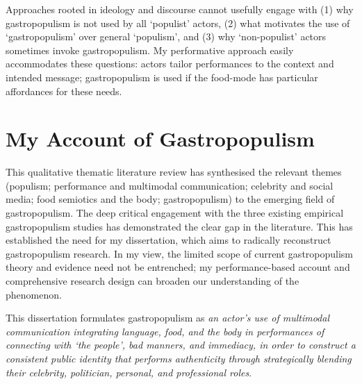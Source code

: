 \documentclass[a4paper, nobind]{templates/ociamthesis}
\begin{document}
Approaches rooted in ideology and discourse cannot usefully engage with (1) why gastropopulism is not used by all `populist' actors, (2) what motivates the use of `gastropopulism' over general `populism', and (3) why `non-populist' actors sometimes invoke gastropopulism. My performative approach easily accommodates these questions: actors tailor performances to the context and intended message; gastropopulism is used if the food-mode has particular affordances for these needs.

\hypertarget{my-account-of-gastropopulism}{%
\section{My Account of Gastropopulism}\label{my-account-of-gastropopulism}}

This qualitative thematic literature review has synthesised the relevant themes (populism; performance and multimodal communication; celebrity and social media; food semiotics and the body; gastropopulism) to the emerging field of gastropopulism. The deep critical engagement with the three existing empirical gastropopulism studies has demonstrated the clear gap in the literature. This has established the need for my dissertation, which aims to radically reconstruct gastropopulism research. In my view, the limited scope of current gastropopulism theory and evidence need not be entrenched; my performance-based account and comprehensive research design can broaden our understanding of the phenomenon.

This dissertation formulates gastropopulism as \emph{an actor's use of multimodal communication integrating language, food, and the body in performances of connecting with `the people', bad manners, and immediacy, in order to construct a consistent public identity that performs authenticity through strategically blending their celebrity, politician, personal, and professional roles}.
\end{document}
